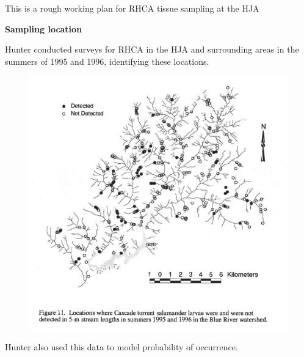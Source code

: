 \documentclass{article}
\begin{document}
	
This is a rough working plan for RHCA tissue sampling at the HJA
\begin{center}
	\textbf{Sampling location}
\end{center}

\begin{flushleft}
	Hunter conducted surveys for RHCA in the HJA and surrounding areas in the summers of 1995 and 1996, identifying these locations.
\end{flushleft}

\begin{figure}[h]
	\centering
	\includegraphics[scale=0.4]{Hunter.hj.results.png}
\end{figure}

\begin{flushleft}
	Hunter also used this data to model probability of occurrence.
\end{flushleft}
\end{document}
